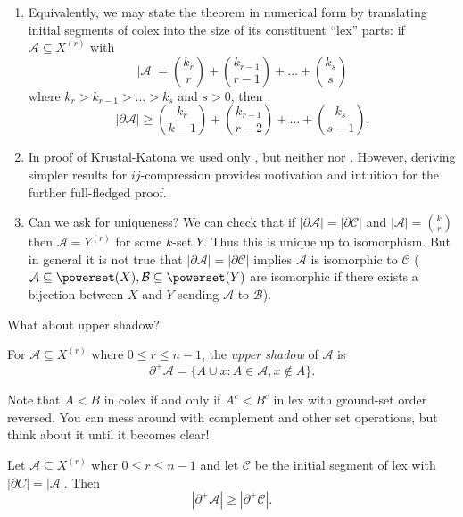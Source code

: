 \documentclass[a4paper]{article}
\newcommand{\shadow}{\partial}
\begin{document}
\begin{remark}\leavevmode
  \begin{enumerate}
  \item Equivalently, we may state the theorem in numerical form by translating initial segments of colex into the size of its constituent ``lex'' parts: if \(\mathcal A \subseteq X^{(r)}\) with
    \[
      |\mathcal A| = \binom{k_r}{r} + \binom{k_{r - 1}}{r - 1} + \dots + \binom{k_s}{s}
    \]
    where \(k_r > k_{r - 1} > \dots > k_s\) and \(s > 0\), then
    \[
      |\shadow \mathcal A| \geq \binom{k_r}{k - 1} + \binom{k_{r - 1}}{r - 2} + \dots + \binom{k_s}{s - 1}.
    \]
  \item In proof of Krustal-Katona we used only , but neither  nor . However, deriving simpler results for \(ij\)-compression provides motivation and intuition for the further full-fledged proof.
  \item Can we ask for uniqueness? We can check that if \(|\shadow \mathcal A| = |\shadow \mathcal C|\) and \(|\mathcal A| = \binom{k}{r}\) then \(\mathcal A = Y^{(r)}\) for some \(k\)-set \(Y\). Thus this is unique up to isomorphism. But in general it is not true that \(|\shadow \mathcal A| = |\shadow \mathcal C|\) implies \(\mathcal A\) is isomorphic to \(\mathcal C\) (\(\mathcal A \subseteq \powerset(X), \mathcal B \subseteq \powerset(Y)\) are isomorphic if there exists a bijection between \(X\) and \(Y\) sending \(\mathcal A\) to \(\mathcal B\)).
  \end{enumerate}
\end{remark}

What about upper shadow?

\begin{definition}
  For \(\mathcal A \subseteq X^{(r)}\) where \(0 \leq r \leq n - 1\), the \emph{upper shadow} of \(\mathcal A\) is
  \[
    \shadow^+ \mathcal A = \{A \cup x: A \in \mathcal A, x \notin A\}.
  \]
\end{definition}

Note that \(A < B\) in colex if and only if \(A^c < B^c\) in lex with ground-set order reversed. You can mess around with complement and other set operations, but think about it until it becomes clear!

\begin{corollary}
  Let \(\mathcal A \subseteq X^{(r)}\) wher \(0 \leq r \leq n - 1\) and let \(\mathcal C\) be the initial segment of lex with \(|\shadow C| = |\mathcal A|\). Then
  \[
    |\shadow^+ \mathcal A| \geq |\shadow^+ \mathcal C|.
  \]
\end{corollary}
\end{document}

